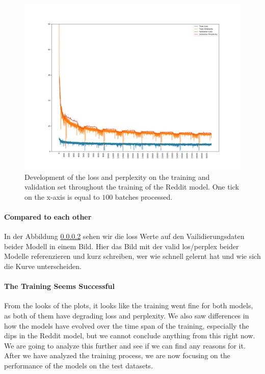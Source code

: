 \begin{figure}[H]
	\includegraphics[width=\linewidth]{img/plots/reddit/train_metrics.png}
	\caption{Development of the loss and perplexity on the training and validation set throughout the training of the Reddit model. One tick on the x-axis is equal to $100$ batches processed.}
	\label{results:learning_process:metrics:reddit}
\end{figure}

\paragraph{Compared to each other} In der Abbildung \ref{} sehen wir die loss Werte auf den Vailidierungsdaten beider Modell in einem Bild. Hier das Bild mit der valid los/perplex beider Modelle referenzieren und kurz schreiben, wer wie schnell gelernt hat und wie sich die Kurve unterscheiden. 

\paragraph{The Training Seems Successful} From the looks of the plots, it looks like the training went fine for both models, as both of them have degrading loss and perplexity. We also saw differences in how the models have evolved over the time span of the training, especially the dips in the Reddit model, but we cannot conclude anything from this right now. We are going to analyze this further and see if we can find any reasons for it. After we have analyzed the training process, we are now focusing on the performance of the models on the test datasets.

